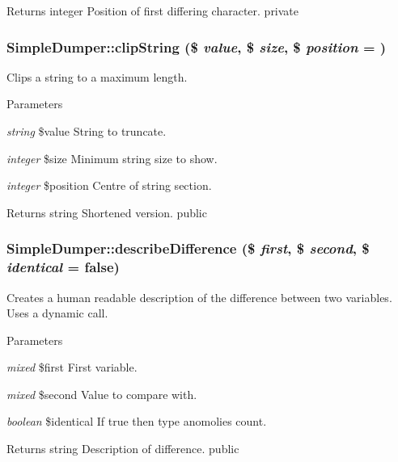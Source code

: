 \begin{DoxyReturn}{Returns}
integer Position of first differing character.  private 
\end{DoxyReturn}
\hypertarget{class_simple_dumper_ac86927b4e1d50b38568e384921703abc}{
\subsubsection[{clipString}]{\setlength{\rightskip}{0pt plus 5cm}SimpleDumper::clipString (\$ {\em value}, \/  \$ {\em size}, \/  \$ {\em position} = {})}}
\label{class_simple_dumper_ac86927b4e1d50b38568e384921703abc}
Clips a string to a maximum length. 
\begin{DoxyParams}{Parameters}
\item[{\em string}]\$value String to truncate. \item[{\em integer}]\$size Minimum string size to show. \item[{\em integer}]\$position Centre of string section. \end{DoxyParams}
\begin{DoxyReturn}{Returns}
string Shortened version.  public 
\end{DoxyReturn}
\hypertarget{class_simple_dumper_a78fae8eec932f81837b42b3a04edaed4}{
\subsubsection[{describeDifference}]{\setlength{\rightskip}{0pt plus 5cm}SimpleDumper::describeDifference (\$ {\em first}, \/  \$ {\em second}, \/  \$ {\em identical} = {\ttfamily false})}}
\label{class_simple_dumper_a78fae8eec932f81837b42b3a04edaed4}
Creates a human readable description of the difference between two variables. Uses a dynamic call. 
\begin{DoxyParams}{Parameters}
\item[{\em mixed}]\$first First variable. \item[{\em mixed}]\$second Value to compare with. \item[{\em boolean}]\$identical If true then type anomolies count. \end{DoxyParams}
\begin{DoxyReturn}{Returns}
string Description of difference.  public 
\end{DoxyReturn}
